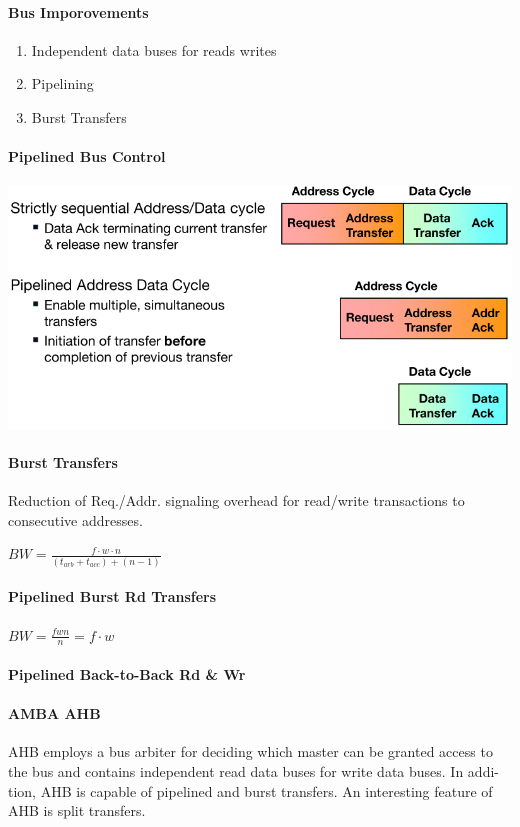 \documentclass[english]{latex4ei/latex4ei_sheet}
\begin{document}
\paragraph{Bus Imporovements}
\begin{enumerate}
	\item Independent data buses for reads writes
	\item Pipelining
	\item Burst Transfers
\end{enumerate}

\paragraph{Pipelined Bus Control}
\begin{center}
	\centering
	\includegraphics[width=0.75\linewidth]{images//6.Interconnects/PipelinedBusControl.png}
\end{center}

\paragraph{Burst Transfers} Reduction of Req./Addr. signaling overhead for read/write transactions to consecutive addresses.

$BW = \frac{f \cdot w \cdot n}{(t_{arb} + t_{acc}) + (n - 1)}$
\paragraph{Pipelined Burst Rd Transfers}

$BW = \frac{f w n}{n} = f \cdot w$

\paragraph{Pipelined Back-to-Back Rd \& Wr}

\paragraph{AMBA AHB} AHB employs a bus arbiter for deciding which master can be granted
access to the bus and contains independent read data buses for write data buses. In addi-
tion, AHB is capable of pipelined and burst transfers. An interesting feature of AHB is split
transfers.
\end{document}
